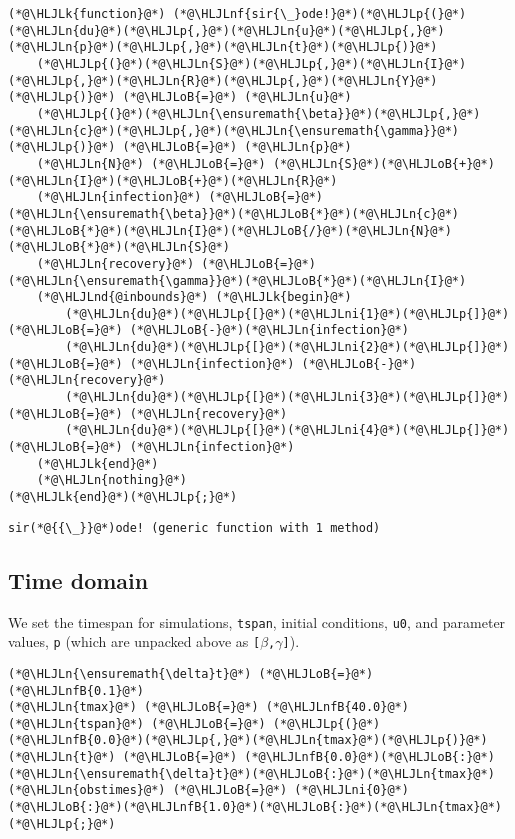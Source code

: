 \documentclass[12pt,a4paper]{article}
\newcommand{\HLJLk}[1]{\textcolor[RGB]{148,91,176}{\textbf{#1}}}
\newcommand{\HLJLn}[1]{#1}
\newcommand{\HLJLnd}[1]{\textcolor[RGB]{214,102,97}{#1}}
\newcommand{\HLJLnf}[1]{\textcolor[RGB]{66,102,213}{#1}}
\newcommand{\HLJLnfB}[1]{\textcolor[RGB]{59,151,46}{#1}}
\newcommand{\HLJLni}[1]{\textcolor[RGB]{59,151,46}{#1}}
\newcommand{\HLJLoB}[1]{\textcolor[RGB]{102,102,102}{\textbf{#1}}}
\newcommand{\HLJLp}[1]{#1}
\begin{document}
\begin{lstlisting}
(*@\HLJLk{function}@*) (*@\HLJLnf{sir{\_}ode!}@*)(*@\HLJLp{(}@*)(*@\HLJLn{du}@*)(*@\HLJLp{,}@*)(*@\HLJLn{u}@*)(*@\HLJLp{,}@*)(*@\HLJLn{p}@*)(*@\HLJLp{,}@*)(*@\HLJLn{t}@*)(*@\HLJLp{)}@*)
    (*@\HLJLp{(}@*)(*@\HLJLn{S}@*)(*@\HLJLp{,}@*)(*@\HLJLn{I}@*)(*@\HLJLp{,}@*)(*@\HLJLn{R}@*)(*@\HLJLp{,}@*)(*@\HLJLn{Y}@*)(*@\HLJLp{)}@*) (*@\HLJLoB{=}@*) (*@\HLJLn{u}@*)
    (*@\HLJLp{(}@*)(*@\HLJLn{\ensuremath{\beta}}@*)(*@\HLJLp{,}@*)(*@\HLJLn{c}@*)(*@\HLJLp{,}@*)(*@\HLJLn{\ensuremath{\gamma}}@*)(*@\HLJLp{)}@*) (*@\HLJLoB{=}@*) (*@\HLJLn{p}@*)
    (*@\HLJLn{N}@*) (*@\HLJLoB{=}@*) (*@\HLJLn{S}@*)(*@\HLJLoB{+}@*)(*@\HLJLn{I}@*)(*@\HLJLoB{+}@*)(*@\HLJLn{R}@*)
    (*@\HLJLn{infection}@*) (*@\HLJLoB{=}@*) (*@\HLJLn{\ensuremath{\beta}}@*)(*@\HLJLoB{*}@*)(*@\HLJLn{c}@*)(*@\HLJLoB{*}@*)(*@\HLJLn{I}@*)(*@\HLJLoB{/}@*)(*@\HLJLn{N}@*)(*@\HLJLoB{*}@*)(*@\HLJLn{S}@*)
    (*@\HLJLn{recovery}@*) (*@\HLJLoB{=}@*) (*@\HLJLn{\ensuremath{\gamma}}@*)(*@\HLJLoB{*}@*)(*@\HLJLn{I}@*)
    (*@\HLJLnd{@inbounds}@*) (*@\HLJLk{begin}@*)
        (*@\HLJLn{du}@*)(*@\HLJLp{[}@*)(*@\HLJLni{1}@*)(*@\HLJLp{]}@*) (*@\HLJLoB{=}@*) (*@\HLJLoB{-}@*)(*@\HLJLn{infection}@*)
        (*@\HLJLn{du}@*)(*@\HLJLp{[}@*)(*@\HLJLni{2}@*)(*@\HLJLp{]}@*) (*@\HLJLoB{=}@*) (*@\HLJLn{infection}@*) (*@\HLJLoB{-}@*) (*@\HLJLn{recovery}@*)
        (*@\HLJLn{du}@*)(*@\HLJLp{[}@*)(*@\HLJLni{3}@*)(*@\HLJLp{]}@*) (*@\HLJLoB{=}@*) (*@\HLJLn{recovery}@*)
        (*@\HLJLn{du}@*)(*@\HLJLp{[}@*)(*@\HLJLni{4}@*)(*@\HLJLp{]}@*) (*@\HLJLoB{=}@*) (*@\HLJLn{infection}@*)
    (*@\HLJLk{end}@*)
    (*@\HLJLn{nothing}@*)
(*@\HLJLk{end}@*)(*@\HLJLp{;}@*)
\end{lstlisting}

\begin{lstlisting}
sir(*@{{\_}}@*)ode! (generic function with 1 method)
\end{lstlisting}


\subsection{Time domain}
We set the timespan for simulations, \texttt{tspan}, initial conditions, \texttt{u0}, and parameter values, \texttt{p} (which are unpacked above as \texttt{[\ensuremath{\beta},\ensuremath{\gamma}]}).


\begin{lstlisting}
(*@\HLJLn{\ensuremath{\delta}t}@*) (*@\HLJLoB{=}@*) (*@\HLJLnfB{0.1}@*)
(*@\HLJLn{tmax}@*) (*@\HLJLoB{=}@*) (*@\HLJLnfB{40.0}@*)
(*@\HLJLn{tspan}@*) (*@\HLJLoB{=}@*) (*@\HLJLp{(}@*)(*@\HLJLnfB{0.0}@*)(*@\HLJLp{,}@*)(*@\HLJLn{tmax}@*)(*@\HLJLp{)}@*)
(*@\HLJLn{t}@*) (*@\HLJLoB{=}@*) (*@\HLJLnfB{0.0}@*)(*@\HLJLoB{:}@*)(*@\HLJLn{\ensuremath{\delta}t}@*)(*@\HLJLoB{:}@*)(*@\HLJLn{tmax}@*)
(*@\HLJLn{obstimes}@*) (*@\HLJLoB{=}@*) (*@\HLJLni{0}@*)(*@\HLJLoB{:}@*)(*@\HLJLnfB{1.0}@*)(*@\HLJLoB{:}@*)(*@\HLJLn{tmax}@*)(*@\HLJLp{;}@*)
\end{lstlisting}
\end{document}
